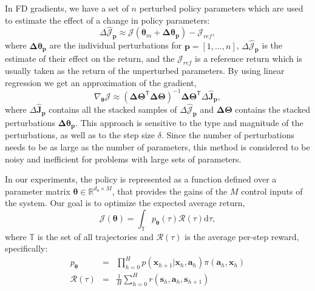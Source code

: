\documentclass{aamas2016}
\renewcommand{\Re}{\mathbb{R}}
\newcommand{\transpose}{\text{$\mathsf{T}$}}
\begin{document}
In FD gradients, we have a set of $n$ perturbed policy parameters which are used to estimate the effect of a change in policy parameters:
\begin{displaymath}
 \Delta\hat{\mathcal{J}}_{\mathbf{p}} \approx \mathcal{J}(\boldsymbol{\theta}_{m}+\boldsymbol{\Delta\theta_{p}}) - \mathcal{J}_{ref},
\end{displaymath}
where $\boldsymbol{\Delta\theta_{p}}$ are the individual perturbations for $\mathbf{p}=[1,\ldots,n]$, $\Delta\hat{\mathcal{J}}_{\mathbf{p}}$ is the estimate of their 
effect on the return, and the $\mathcal{J}_{ref}$ is a reference return which is usually taken as the return of the unperturbed
parameters. By using linear regression we get an approximation of the gradient,
\begin{displaymath}
 \nabla_{\boldsymbol{\theta}}\mathcal{J} \approx \left(\boldsymbol{\Delta\Theta^{\transpose}\Delta\Theta}\right)^{-1}\boldsymbol{\Delta\Theta}^{\transpose}\Delta\boldsymbol{\hat{J}_{p}},
\end{displaymath}
where $\Delta\boldsymbol{\hat{J}_{p}}$ contains all the stacked samples of $\Delta\hat{\mathcal{J}}_{\mathbf{p}}$ and  $\boldsymbol{\Delta\Theta}$
contains the stacked perturbations $\boldsymbol{\Delta\theta_{p}}$. This approach is sensitive to the type and magnitude of the perturbations, as well as
to the step size $\delta$. Since the number of perturbations needs to be as large as the number of parameters, this method is
considered to be noisy and inefficient for problems with large sets of parameters.%

In our experiments, the policy is represented as a function defined over a parameter matrix 
$\boldsymbol{\theta} \in \Re^{d_{\theta}\times M}$, that provides the gains of the $M$ control inputs of the system. 
Our goal is to optimize the expected average return,
\begin{equation}
 \mathcal{J}(\boldsymbol{\theta})=\int_{\mathbb{T}}p_{\boldsymbol{\theta}}(\tau)\mathcal{R}(\tau)\mbox{d}\tau,
 \label{retPG}
\end{equation}
where $\mathbb{T}$ is the set of all trajectories and $\mathcal{R}(\tau)$ is the average per-step reward, specifically:
\begin{eqnarray}
 p_{\boldsymbol{\theta}} & = & \prod_{h=0}^{H}p(\mathbf{x}_{h+1}|\mathbf{x}_{h},\mathbf{a}_{h})\pi(\mathbf{a}_{h},\mathbf{x}_{h}) \nonumber \\
 \mathcal{R}(\tau) & = & \frac{1}{H}\sum_{h=0}^{H} r(\mathbf{s}_{h},\mathbf{a}_{h},\mathbf{s}_{h+1}) \nonumber
\end{eqnarray}
\end{document}
